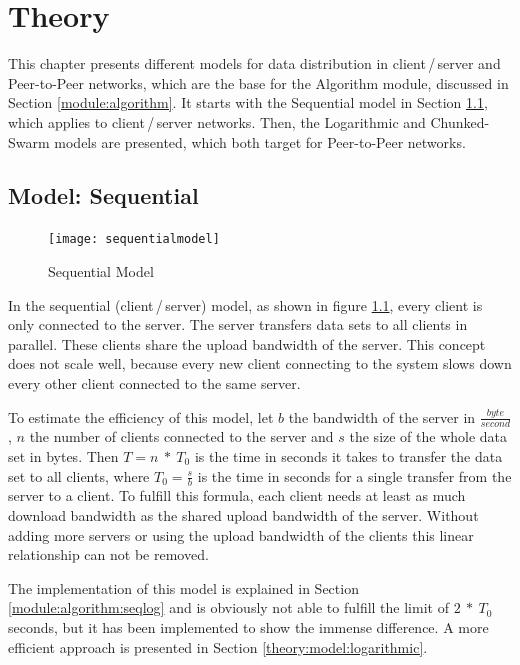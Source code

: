 
\chapter{Theory}
\label{theory}

This chapter presents different models for data distribution in client\,/\,server and Peer-to-Peer networks, which are the base for the Algorithm module, discussed in Section \ref{module:algorithm}. It starts with the Sequential model in Section \ref{theory:model:sequential}, which applies to client\,/\,server networks. Then, the Logarithmic and Chunked-Swarm models are presented, which both target for Peer-to-Peer networks.

\section{Model: Sequential}
\label{theory:model:sequential}

\begin{figure}[ht]
	\centering
	\texttt{[image: sequentialmodel]}
	\caption{Sequential Model}
	\label{fig:sequentialmodel}
\end{figure}

In the sequential (client\,/\,server) model, as shown in figure \ref{fig:sequentialmodel}, every client is only connected to the server. The server transfers data sets to all clients in parallel. These clients share the upload bandwidth of the server. This concept does not scale well, because every new client connecting to the system slows down every other client connected to the same server. 

To estimate the efficiency of this model, let $b$ the bandwidth of the server in $\frac{byte}{second}$, $n$ the number of clients connected to the server and $s$ the size of the whole data set in bytes. Then $T= n\:*\:T_0$ is the time in seconds it takes to transfer the data set to all clients, where $T_0=\frac{s}{b}$ is the time in seconds for a single transfer from the server to a client. To fulfill this formula, each client needs at least as much download bandwidth as the shared upload bandwidth of the server. Without adding more servers or using the upload bandwidth of the clients this linear relationship can not be removed. 

The implementation of this model is explained in Section \ref{module:algorithm:seqlog} and is obviously not able to fulfill the limit of $2\:*\:T_0$ seconds, but it has been implemented to show the immense difference. A more efficient approach is presented in Section \ref{theory:model:logarithmic}.

